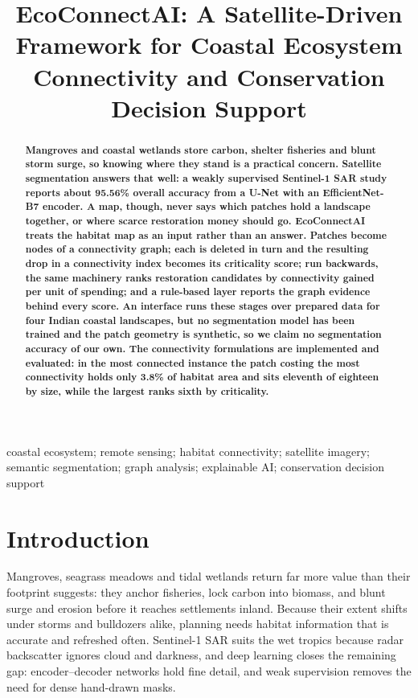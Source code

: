 \documentclass[conference]{IEEEtran}
\title{
\textbf{EcoConnectAI: A Satellite-Driven Framework for Coastal Ecosystem Connectivity and Conservation Decision Support}
}
\author{
\IEEEauthorblockN{~}
\IEEEauthorblockA{~}
}
\begin{document}
\maketitle


\begin{abstract}
\bfseries
Mangroves and coastal wetlands store carbon, shelter fisheries and blunt storm surge, so knowing where they stand is a practical concern. Satellite segmentation answers that well: a weakly supervised Sentinel-1 SAR study reports about 95.56\% overall accuracy from a U-Net with an EfficientNet-B7 encoder. A map, though, never says which patches hold a landscape together, or where scarce restoration money should go. EcoConnectAI treats the habitat map as an input rather than an answer. Patches become nodes of a connectivity graph; each is deleted in turn and the resulting drop in a connectivity index becomes its criticality score; run backwards, the same machinery ranks restoration candidates by connectivity gained per unit of spending; and a rule-based layer reports the graph evidence behind every score. An interface runs these stages over prepared data for four Indian coastal landscapes, but no segmentation model has been trained and the patch geometry is synthetic, so we claim no segmentation accuracy of our own. The connectivity formulations are implemented and evaluated: in the most connected instance the patch costing the most connectivity holds only 3.8\% of habitat area and sits eleventh of eighteen by size, while the largest ranks sixth by criticality.
\end{abstract}

\begin{IEEEkeywords}
coastal ecosystem; remote sensing; habitat connectivity; satellite imagery; semantic segmentation; graph analysis; explainable AI; conservation decision support
\end{IEEEkeywords}


\section{Introduction}

Mangroves, seagrass meadows and tidal wetlands return far more value than their footprint suggests: they anchor fisheries, lock carbon into biomass, and blunt surge and erosion before it reaches settlements inland. Because their extent shifts under storms and bulldozers alike, planning needs habitat information that is accurate and refreshed often. Sentinel-1 SAR suits the wet tropics because radar backscatter ignores cloud and darkness, and deep learning closes the remaining gap: encoder--decoder networks hold fine detail, and weak supervision removes the need for dense hand-drawn masks.
\end{document}
